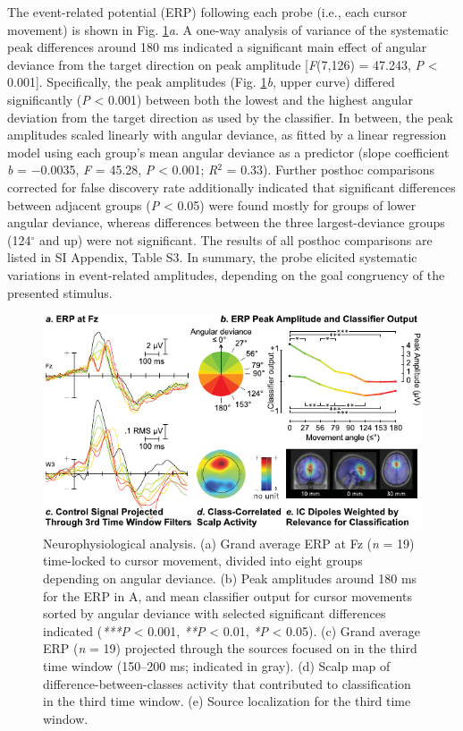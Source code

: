 The event-related potential (ERP) following each probe (i.e., each cursor movement) is shown in Fig. \ref{fig:nat:figure1}\emph{a}. A one-way analysis of variance of the systematic peak differences around 180 ms indicated a significant main effect of angular deviance from the target direction on peak amplitude [\textit{F}(7,126) = 47.243, \textit{P} < 0.001]. Specifically, the peak amplitudes (Fig. \ref{fig:nat:figure1}\emph{b}, upper curve) differed significantly (\textit{P} < 0.001) between both the lowest and the highest angular deviation from the target direction as used by the classifier. In between, the peak amplitudes scaled linearly with angular deviance, as fitted by a linear regression model using each group's mean angular deviance as a predictor (slope coefficient \textit{b} = −0.0035, \textit{F} = 45.28, \textit{P} < 0.001; \textit{R$^{2}$} = 0.33). Further posthoc comparisons corrected for false discovery rate additionally indicated that significant differences between adjacent groups (\textit{P} < 0.05) were found mostly for groups of lower angular deviance, whereas differences between the three largest-deviance groups (124$^{\circ}$ and up) were not significant. The results of all posthoc comparisons are listed in SI Appendix, Table S3. In summary, the probe elicited systematic variations in event-related amplitudes, depending on the goal congruency of the presented stimulus.

\begin{figure}[ht]
    \centering
    \includegraphics[width=\textwidth]{figures/nat-figure1.pdf}
    \caption[Neurophysiological analysis.]{Neurophysiological analysis. (a) Grand average ERP at Fz (\textit{n} = 19) time-locked to cursor movement, divided into eight groups depending on angular deviance. (b) Peak amplitudes around 180 ms for the ERP in A, and mean classifier output for cursor movements sorted by angular deviance with selected significant differences indicated (\textit{***P} < 0.001, \textit{**P} < 0.01, \textit{*P} < 0.05). (c) Grand average ERP (\textit{n} = 19) projected through the sources focused on in the third time window (150–200 ms; indicated in gray). (d) Scalp map of difference-between-classes activity that contributed to classification in the third time window. (e) Source localization for the third time window.}
    \label{fig:nat:figure1}
\end{figure}


